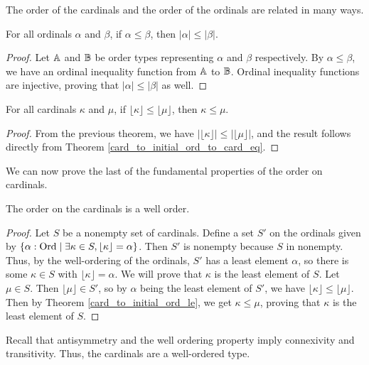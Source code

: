 \documentclass[../../math.tex]{subfiles}
\begin{document}
The order of the cardinals and the order of the ordinals are related in many
ways.

\begin{theorem} \label{ord_to_card_le}
    For all ordinals $\alpha$ and $\beta$, if $\alpha \leq \beta$, then
    $|\alpha| \leq |\beta|$.
\end{theorem}
\begin{proof}
    Let $\mathbb{A}$ and $\mathbb{B}$ be order types representing $\alpha$ and $\beta$
    respectively.  By $\alpha \leq \beta$, we have an ordinal inequality
    function from $\mathbb{A}$ to $\mathbb{B}$.  Ordinal inequality functions are injective,
    proving that $|\alpha| \leq |\beta|$ as well.
\end{proof}

\begin{theorem} \label{card_to_initial_ord_le}
    For all cardinals $\kappa$ and $\mu$, if $\lfloor \kappa \rfloor \leq
    \lfloor \mu \rfloor$, then $\kappa \leq \mu$.
\end{theorem}
\begin{proof}
    From the previous theorem, we have $|\lfloor \kappa \rfloor| \leq |\lfloor
    \mu \rfloor|$, and the result follows directly from Theorem
    \ref{card_to_initial_ord_to_card_eq}.
\end{proof}

We can now prove the last of the fundamental properties of the order on
cardinals.

\begin{instance}
    The order on the cardinals is a well order.
\end{instance}
\begin{proof}
    Let $S$ be a nonempty set of cardinals.  Define a set $S'$ on the ordinals
    given by $\{\alpha : \operatorname{Ord} \mid \exists \kappa \in S, \lfloor \kappa \rfloor
    = \alpha\}$.  Then $S'$ is nonempty because $S$ in nonempty.  Thus, by the
    well-ordering of the ordinals, $S'$ has a least element $\alpha$, so there
    is some $\kappa \in S$ with $\lfloor \kappa \rfloor = \alpha$.  We will
    prove that $\kappa$ is the least element of $S$.  Let $\mu \in S$.  Then
    $\lfloor \mu \rfloor \in S'$, so by $\alpha$ being the least element of
    $S'$, we have $\lfloor \kappa \rfloor \leq \lfloor \mu \rfloor$.  Then by
    Theorem \ref{card_to_initial_ord_le}, we get $\kappa \leq \mu$, proving that
    $\kappa$ is the least element of $S$.
\end{proof}

Recall that antisymmetry and the well ordering property imply connexivity and
transitivity.  Thus, the cardinals are a well-ordered type.
\end{document}
